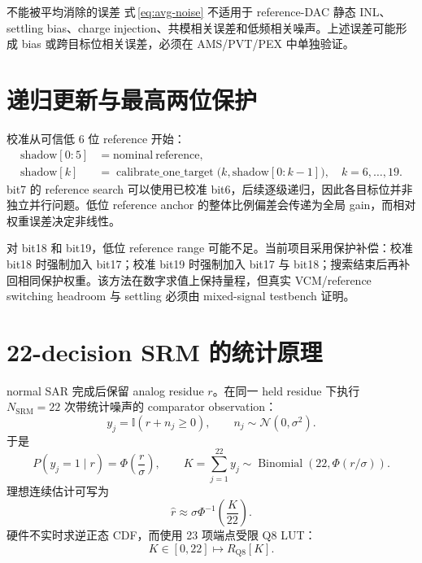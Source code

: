 \documentclass[UTF8,fontset=none,a4paper,11pt,openany]{ctexrep}
\begin{document}
\begin{riskbox}{不能被平均消除的误差}
式\,\eqref{eq:avg-noise} 不适用于 reference-DAC 静态 INL、settling bias、charge injection、共模相关误差和低频相关噪声。上述误差可能形成 bias 或跨目标位相关误差，必须在 AMS/PVT/PEX 中单独验证。
\end{riskbox}

\section{递归更新与最高两位保护}

校准从可信低 6 位 reference 开始：
\begin{equation}
\begin{aligned}
\mathrm{shadow}[0{:}5]&=\mathrm{nominal\ reference},\\
\mathrm{shadow}[k]&=\operatorname{calibrate\_one\_target}
\bigl(k,\mathrm{shadow}[0{:}k-1]\bigr),\quad k=6,\ldots,19.
\end{aligned}
\end{equation}
bit7 的 reference search 可以使用已校准 bit6，后续逐级递归，因此各目标位并非独立并行问题。低位 reference anchor 的整体比例偏差会传递为全局 gain，而相对权重误差决定非线性。

对 bit18 和 bit19，低位 reference range 可能不足。当前项目采用保护补偿：校准 bit18 时强制加入 bit17；校准 bit19 时强制加入 bit17 与 bit18；搜索结束后再补回相同保护权重。该方法在数字求值上保持量程，但真实 VCM/reference switching headroom 与 settling 必须由 mixed-signal testbench 证明。

\section{22-decision SRM 的统计原理}

normal SAR 完成后保留 analog residue $r$。在同一 held residue 下执行 $N_{\mathrm{SRM}}=22$ 次带统计噪声的 comparator observation：
\begin{equation}
y_j=\mathbb{I}(r+n_j\ge 0),\qquad n_j\sim\mathcal N(0,\sigma^2).
\end{equation}
于是
\begin{equation}
P(y_j=1\mid r)=\Phi\!\left(\frac{r}{\sigma}\right),\qquad
K=\sum_{j=1}^{22}y_j\sim\operatorname{Binomial}\!\left(22,\Phi(r/\sigma)\right).
\end{equation}
理想连续估计可写为
\begin{equation}
\widehat r\approx\sigma\Phi^{-1}\!\left(\frac{K}{22}\right).
\label{eq:srm-invcdf}
\end{equation}
硬件不实时求逆正态 CDF，而使用 23 项端点受限 Q8 LUT：
\begin{equation}
K\in[0,22]\longmapsto R_{\mathrm{Q8}}[K].
\end{equation}
\end{document}
